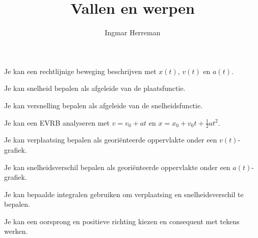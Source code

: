 \documentclass{ximera}
\title{Vallen en werpen}
\author{Ingmar Herreman}
\begin{document}





\maketitle



\begin{voorkennis}
  \item Je kan een rechtlijnige beweging beschrijven met $x(t)$, $v(t)$ en $a(t)$.
  \item Je kan snelheid bepalen als afgeleide van de plaatsfunctie.
  \item Je kan versnelling bepalen als afgeleide van de snelheidsfunctie.
  \item Je kan een EVRB analyseren met
        $v=v_0+at$ en
        $x=x_0+v_0t+\frac12at^2$.
  \item Je kan verplaatsing bepalen als georiënteerde oppervlakte onder een $v(t)$-grafiek.
  \item Je kan snelheidsverschil bepalen als georiënteerde oppervlakte onder een $a(t)$-grafiek.
  \item Je kan bepaalde integralen gebruiken om verplaatsing en snelheidsverschil te bepalen.
  \item Je kan een oorsprong en positieve richting kiezen en consequent met tekens werken.
\end{voorkennis}
\end{document}
